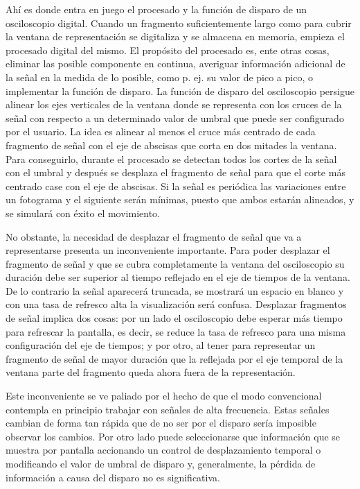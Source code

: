 Ahí es donde entra en juego el procesado y la función de disparo de un
osciloscopio digital. Cuando un fragmento suficientemente largo como para
cubrir la ventana de representación se digitaliza y se almacena en memoria,
empieza el procesado digital del mismo. El propósito del procesado es, ente
otras cosas, eliminar las posible componente en continua, averiguar
información adicional de la señal en la medida de lo posible, como p. ej.
su valor de pico a pico, o implementar la función de disparo. La función de
disparo del osciloscopio persigue alinear los ejes verticales de la ventana
donde se representa con los cruces de la señal con respecto a un
determinado valor de umbral que puede ser configurado por el usuario. La
idea es alinear al menos el cruce más centrado de cada fragmento de señal
con el eje de abscisas que corta en dos mitades la ventana. Para
conseguirlo, durante el procesado se detectan todos los cortes de la señal
con el umbral y después se desplaza el fragmento de señal para que el corte
más centrado case con el eje de abscisas. Si la señal es periódica las
variaciones entre un fotograma y el siguiente serán mínimas, puesto que
ambos estarán alineados, y se simulará con éxito el movimiento.

No obstante, la necesidad de desplazar el fragmento de señal que va a
representarse presenta un inconveniente importante. Para poder desplazar el
fragmento de señal y que se cubra completamente la ventana del osciloscopio
su duración debe ser superior al tiempo reflejado en el eje de tiempos de
la ventana. De lo contrario la señal aparecerá truncada, se mostrará un
espacio en blanco y con una tasa de refresco alta la visualización será
confusa. Desplazar fragmentos de señal implica dos cosas: por un lado el
osciloscopio debe esperar más tiempo para refrescar la pantalla, es decir,
se reduce la tasa de refresco para una misma configuración del eje de
tiempos; y por otro, al tener para representar un fragmento de señal de
mayor duración que la reflejada por el eje temporal de la ventana parte del
fragmento queda ahora fuera de la representación.

Este inconveniente se ve paliado por el hecho de que el modo convencional
contempla en principio trabajar con señales de alta frecuencia. Estas
señales cambian de forma tan rápida que de no ser por el disparo sería
imposible observar los cambios. Por otro lado puede seleccionarse que
información que se muestra por pantalla accionando un control de
desplazamiento temporal o modificando el valor de umbral de disparo y,
generalmente, la pérdida de información a causa del disparo no es
significativa.


